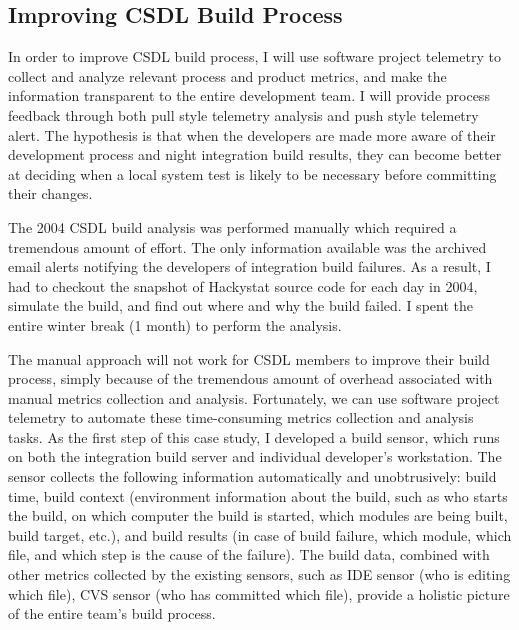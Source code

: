 	
	
\subsection{Improving CSDL Build Process}	 
\label{EvaluationInCSDL:Design:ImproveBuildProcess}
	
In order to improve CSDL build process, I will use software project telemetry to collect and analyze relevant process and product metrics, and make the information transparent to the entire development team. I will provide process feedback through both pull style telemetry analysis and push style telemetry alert. The hypothesis is that when the developers are made more aware of their development process and night integration build results, they can become better at deciding when a local system test is likely to be necessary before committing their changes.
%

The 2004 CSDL build analysis was performed manually which required a tremendous amount of effort. The only information available was the archived email alerts notifying the developers of integration build failures. As a result, I had to checkout the snapshot of Hackystat source code for each day in 2004, simulate the build, and find out where and why the build failed. I spent the entire winter break (1 month) to perform the analysis. 

The manual approach will not work for CSDL members to improve their build process, simply because of the tremendous amount of overhead associated with manual metrics collection and analysis. Fortunately, we can use software project telemetry to automate these time-consuming metrics collection and analysis tasks. As the first step of this case study, I developed a build sensor, which runs on both the integration build server and individual developer's workstation. The sensor collects the following information automatically and unobtrusively: build time, build context (environment information about the build, such as who starts the build, on which computer the build is started, which modules are being built, build target, etc.), and build results (in case of build failure, which module, which file, and which step is the cause of the failure). The build data, combined with other metrics collected by the existing sensors, such as IDE sensor (who is editing which file), CVS sensor (who has committed which file), provide a holistic picture of the entire team's build process.



